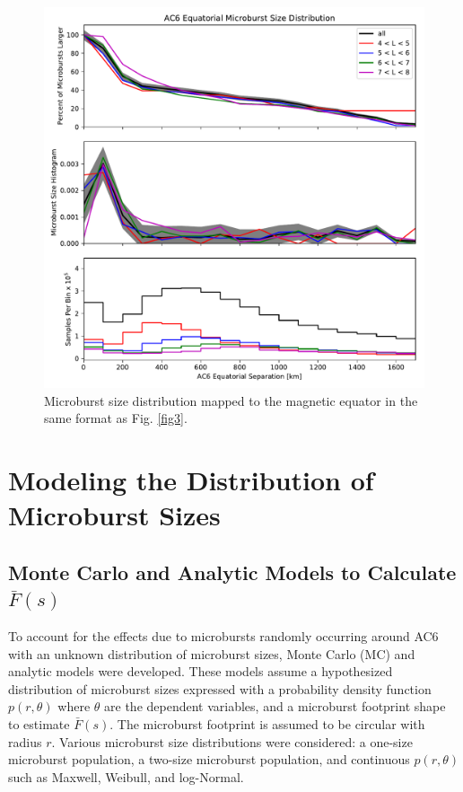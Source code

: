 \documentclass[draft]{agujournal2019}
\begin{document}
\begin{figure}
\includegraphics[width=\textwidth]{fig4.pdf}
\caption{Microburst size distribution mapped to the magnetic equator in the same format as Fig. \ref{fig3}.} 
\label{fig4}
\end{figure}

\section{Modeling the Distribution of Microburst Sizes} \label{model_section}
\subsection{Monte Carlo and Analytic Models to Calculate $\bar{F}(s)$}

To account for the effects due to microbursts randomly occurring around AC6 with an unknown distribution of microburst sizes, Monte Carlo (MC) and analytic models were developed. These models assume a hypothesized distribution of microburst sizes expressed with a probability density function $p(r, \theta)$ where $\theta$ are the dependent variables, and a microburst footprint shape to estimate $\bar{F}(s)$. The microburst footprint is assumed to be circular with radius $r$. Various microburst size distributions were considered: a one-size microburst population, a two-size microburst population, and continuous $p(r, \theta)$ such as Maxwell, Weibull, and log-Normal.
\end{document}
